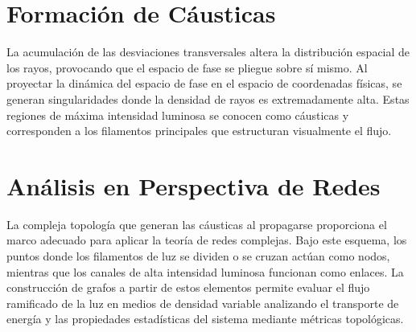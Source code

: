 \section{Formación de Cáusticas}
La acumulación de las desviaciones transversales altera la distribución espacial de los rayos, provocando que el espacio de fase se pliegue sobre sí mismo. Al proyectar la dinámica del espacio de fase en el espacio de coordenadas físicas, se generan singularidades donde la densidad de rayos es extremadamente alta. Estas regiones de máxima intensidad luminosa se conocen como cáusticas y corresponden a los filamentos principales que estructuran visualmente el flujo.

\section{Análisis en Perspectiva de Redes}
La compleja topología que generan las cáusticas al propagarse proporciona el marco adecuado para aplicar la teoría de redes complejas. Bajo este esquema, los puntos donde los filamentos de luz se dividen o se cruzan actúan como nodos, mientras que los canales de alta intensidad luminosa funcionan como enlaces. La construcción de grafos a partir de estos elementos permite evaluar el flujo ramificado de la luz en medios de densidad variable analizando el transporte de energía y las propiedades estadísticas del sistema mediante métricas topológicas.